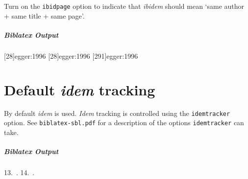 \documentclass{article}
\newenvironment{biboutput}{%
  \subparagraph{Biblatex Output}
}{\color{black}}
\begin{document}
Turn on the \texttt{ibidpage} option to indicate that \emph{ibidem} should
mean ‘same author + same title + same page’.

\makeatletter
\let\blx@imc@ifloccit\blx@ifloccit@global
\let\blx@loccittracker\blx@loccittracker@global
\let\blx@loccitreset\blx@loccitreset@global
\makeatother

\begin{biboutput}
  [28]{egger:1996}
  [28]{egger:1996}
  [291]{egger:1996}
\end{biboutput}

\section*{Default \emph{idem} tracking}

By default \emph{idem} is used. \emph{Idem} tracking is controlled using the
\texttt{idemtracker} option. See \texttt{biblatex-sbl.pdf} for a description
of the options \texttt{idemtracker} can take.

\begin{biboutput}
  \makeatletter\blx@opt@idemtracker@constrict\makeatother
  \color{biblatex-colour}
  \hspace*{\bibindent}13.~\cites[35]{vanseters:1997}{vanseters:1995}.
  \color{black}
  \makeatletter\blx@idemreset\makeatother
  \color{biblatex-colour}
  \hspace*{\bibindent}14.~\cites[35]{vanseters:1997}[222]{vanseters:1995}.
  \color{black}
\end{biboutput}

\printbibliography

\printindex
\end{document}
